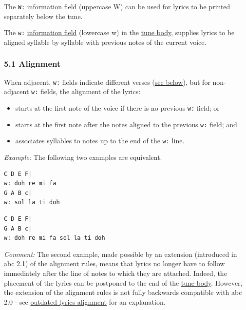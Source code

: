 \documentclass[oneside]{book}
\begin{document}
The \texttt{W:}
\protect\hyperlink{information_field_definition}{information field}
(uppercase W) can be used for lyrics to be printed separately below the
tune.

The \texttt{w:}
\protect\hyperlink{information_field_definition}{information field}
(lowercase w) in the \protect\hyperlink{tune_body_definition}{tune
body}, supplies lyrics to be aligned syllable by syllable with previous
notes of the current voice.

\hypertarget{alignment}{\subsubsection{5.1 Alignment}\label{alignment}}

When adjacent, \texttt{w:} fields indicate different verses
(\protect\hyperlink{verses}{see below}), but for non-adjacent
\texttt{w:} fields, the alignment of the lyrics:

\begin{itemize}
\item
  starts at the first note of the voice if there is no previous
  \texttt{w:} field; or
\item
  starts at the first note after the notes aligned to the previous
  \texttt{w:} field; and
\item
  associates syllables to notes up to the end of the \texttt{w:} line.
\end{itemize}

\emph{Example:} The following two examples are equivalent.

\begin{verbatim}
C D E F|
w: doh re mi fa
G A B c|
w: sol la ti doh
\end{verbatim}

\begin{verbatim}
C D E F|
G A B c|
w: doh re mi fa sol la ti doh
\end{verbatim}

\emph{Comment:} The second example, made possible by an extension
(introduced in abc 2.1) of the alignment rules, means that lyrics no
longer have to follow immediately after the line of notes to which they
are attached. Indeed, the placement of the lyrics can be postponed to
the end of the \protect\hyperlink{tune_body_definition}{tune body}.
However, the extension of the alignment rules is not fully backwards
compatible with abc 2.0 - see
\protect\hyperlink{outdated_lyrics_alignment}{outdated lyrics alignment}
for an explanation.
\end{document}
